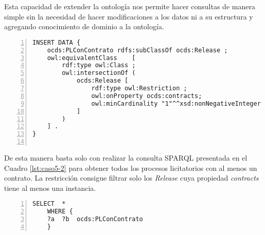 Esta capacidad de extender la ontología nos permite hacer consultas de manera simple sin la necesidad de hacer modificaciones a los datos ni a su estructura y agregando conocimiento de dominio a la ontología.

\hfill \break


\noindent\begin{minipage}[c]{\textwidth}
\begin{lstlisting}[captionpos=b, caption=Extensión de la ontología utilizando restricciones ontológicas, label={lst:caso5-1},  numbers=left,  numberstyle=\tiny\color{mygray},frame=single]
INSERT DATA {
    ocds:PLConContrato rdfs:subClassOf ocds:Release ; 
    owl:equivalentClass    [ 
        rdf:type owl:Class ;
        owl:intersectionOf (   
            ocds:Release [ 
                rdf:type owl:Restriction ;
                owl:onProperty ocds:contracts; 
                owl:minCardinality "1"^^xsd:nonNegativeInteger ;
            ] 
        )
    ] .
}
    
 \end{lstlisting}
\end{minipage}
 De esta manera basta solo con realizar la consulta SPARQL presentada en el Cuadro \ref{lst:caso5-2} para obtener todos los procesos licitatorios con al menos un contrato. La restricción consigue filtrar solo los \textit{Release} cuya propiedad \textit{contracts} tiene al menos una instancia.\hfill \break

\noindent\begin{minipage}[c]{\textwidth}
 \begin{lstlisting}[captionpos=b, caption=Consulta SPARQL utilizando la Clase PLConContrato, label=lst:caso5-2,  numbers=left,  numberstyle=\tiny\color{mygray},frame=single]
SELECT  *
    WHERE { 
    ?a  ?b  ocds:PLConContrato 
    }
 \end{lstlisting}
\end{minipage}
 